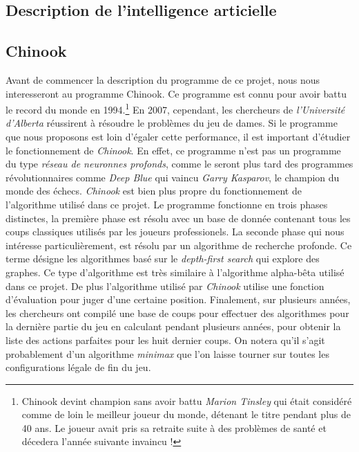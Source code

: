 \documentclass[a4paper,11pt]{article}
\begin{document}
\begin{multicols}{2}[]
\section{Description de l'intelligence articielle}

  \subsection{Chinook}

    Avant de commencer la description du programme de ce projet, nous nous
    interesseront au programme Chinook. Ce programme est connu pour avoir battu
    le record du monde en 1994.\footnote{Chinook devint champion sans avoir
    battu \emph{Marion Tinsley} qui était considéré comme de loin le meilleur
    joueur du monde, détenant le titre pendant plus de 40 ans. Le joueur avait
    pris sa retraite suite à des problèmes de santé et décedera l'année
    suivante invaincu !} En 2007, cependant, les chercheurs de
    \emph{l'Université d'Alberta} réussirent à résoudre le problèmes du jeu de
    dames. Si le programme que nous proposons est loin d'égaler cette
    performance, il est important d'étudier le fonctionnement de
    \emph{Chinook}.  En effet, ce programme n'est pas un programme du type
    \emph{réseau de neuronnes profonds}, comme le seront plus tard des
    programmes révolutionnaires comme \emph{Deep Blue} qui vaincu \emph{Garry
    Kasparov}, le champion du monde des échecs. \emph{Chinook} est bien plus
    propre du fonctionnement de l'algorithme utilisé dans ce projet.  Le
    programme fonctionne en trois phases distinctes, la première phase est
    résolu avec un base de donnée contenant tous les coups classiques utilisés
    par les joueurs professionels. La seconde phase qui nous intéresse
    particulièrement, est résolu par un algorithme de recherche profonde. Ce
    terme désigne les algorithmes basé sur le \emph{depth-first search} qui
    explore des graphes. Ce type d'algorithme est très similaire à l'algorithme
    alpha-bêta utilisé dans ce projet. De plus l'algorithme utilisé par
    \emph{Chinook} utilise une fonction d'évaluation pour juger d'une certaine
    position. Finalement, sur plusieurs années, les chercheurs ont compilé une
    base de coups pour effectuer des algorithmes pour la dernière partie du jeu
    en calculant pendant plusieurs années, pour obtenir la liste des actions
    parfaites pour les huit dernier coups. On notera qu'il s'agit probablement
    d'un algorithme \emph{minimax} que l'on laisse tourner sur toutes les
    configurations légale de fin du jeu.


\end{multicols}
\end{document}
